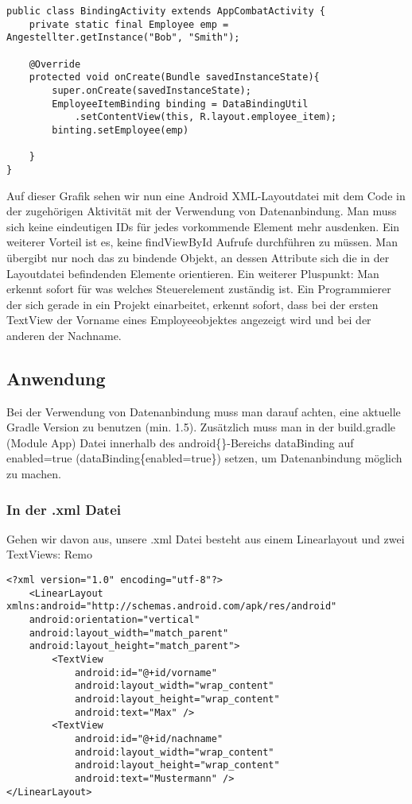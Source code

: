 \documentclass[FIPLY_base.tex]{subfiles}
\begin{document}
\begin{lstlisting}[caption={Die Activity vor dem Einsatz von DataBinding.},label=DescriptiveLabel]
public class BindingActivity extends AppCombatActivity {
	private static final Employee emp = Angestellter.getInstance("Bob", "Smith");

	@Override
	protected void onCreate(Bundle savedInstanceState){
		super.onCreate(savedInstanceState);
		EmployeeItemBinding binding = DataBindingUtil
			.setContentView(this, R.layout.employee_item);
		binting.setEmployee(emp)

	}
}
\end{lstlisting}


Auf dieser Grafik sehen wir nun eine Android XML-Layoutdatei mit dem Code in der zugehörigen Aktivität mit der Verwendung von Datenanbindung. Man muss sich keine eindeutigen IDs für jedes vorkommende Element mehr ausdenken. Ein weiterer Vorteil ist es, keine findViewById Aufrufe durchführen zu müssen. Man übergibt nur noch das zu bindende Objekt, an dessen Attribute sich die in der Layoutdatei befindenden Elemente orientieren. 
Ein weiterer Pluspunkt: Man erkennt sofort für was welches Steuerelement zuständig ist. Ein Programmierer der sich gerade in ein Projekt einarbeitet, erkennt sofort, dass bei der ersten TextView der Vorname eines Employeeobjektes angezeigt wird und bei der anderen der Nachname.


\subsection{Anwendung}
Bei der Verwendung von Datenanbindung muss man darauf achten, eine aktuelle Gradle Version zu benutzen (min. 1.5). Zusätzlich muss man in der build.gradle (Module App) Datei innerhalb des android\{\}-Bereichs dataBinding auf enabled=true (dataBinding\{enabled=true\}) setzen, um Datenanbindung möglich zu machen.
\subsubsection{In der .xml Datei}
Gehen wir davon aus, unsere .xml Datei besteht aus einem Linearlayout und zwei TextViews: Remo

\begin{lstlisting}[caption={Layoutcode ohne jedliche Datenanbindung.},label=DescriptiveLabel]
<?xml version="1.0" encoding="utf-8"?>
	<LinearLayout xmlns:android="http://schemas.android.com/apk/res/android"
	android:orientation="vertical"
	android:layout_width="match_parent"
	android:layout_height="match_parent">
		<TextView
			android:id="@+id/vorname"
			android:layout_width="wrap_content"
			android:layout_height="wrap_content"
			android:text="Max" />
		<TextView
			android:id="@+id/nachname"
			android:layout_width="wrap_content"
			android:layout_height="wrap_content"
			android:text="Mustermann" />
</LinearLayout>

\end{lstlisting}
\end{document}
